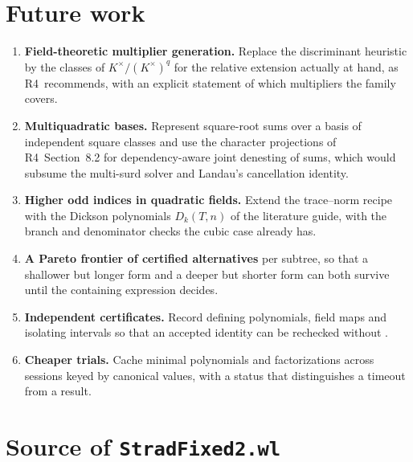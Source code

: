 \documentclass[11pt,oneside]{article}
\numberwithin{equation}{section}
\theoremstyle{definition}
\theoremstyle{remark}
\newcommand{\code}[1]{\texttt{\detokenize{#1}}}
\newcommand{\RIV}{\textsf{R4}}
\begin{document}
\section{Future work}\label{sec:future}
\begin{enumerate}
\item \textbf{Field-theoretic multiplier generation.} Replace the discriminant heuristic by the classes of $K^\times/(K^\times)^q$ for the relative extension actually at hand, as \RIV\ recommends, with an explicit statement of which multipliers the family covers.
\item \textbf{Multiquadratic bases.} Represent square-root sums over a basis of independent square classes and use the character projections of \RIV\ Section~8.2 for dependency-aware joint denesting of sums, which would subsume the multi-surd solver and Landau's cancellation identity.
\item \textbf{Higher odd indices in quadratic fields.} Extend the trace--norm recipe with the Dickson polynomials $D_k(T,n)$ of the literature guide, with the branch and denominator checks the cubic case already has.
\item \textbf{A Pareto frontier of certified alternatives} per subtree, so that a shallower but longer form and a deeper but shorter form can both survive until the containing expression decides.
\item \textbf{Independent certificates.} Record defining polynomials, field maps and isolating intervals so that an accepted identity can be rechecked without \code{RootReduce}.
\item \textbf{Cheaper trials.} Cache minimal polynomials and factorizations across sessions keyed by canonical values, with a status that distinguishes a timeout from a result.
\end{enumerate}

\appendix
\section{Source of \texttt{StradFixed2.wl}}\label{app:source}

\end{document}
